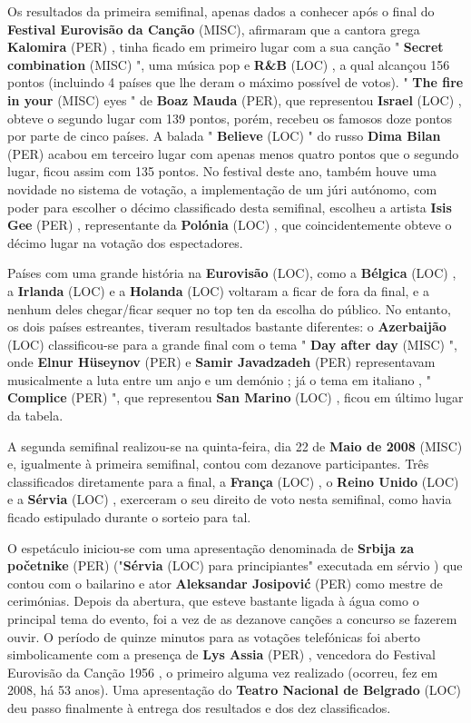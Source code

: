 \documentclass[12pt,a4paper]{article}
\begin{document}
Os resultados da primeira semifinal, apenas dados a conhecer após o final do \textbf{Festival Eurovisão da Canção} (MISC), afirmaram que a cantora grega \textbf{Kalomira} (PER) , tinha ficado em primeiro lugar com a sua canção " \textbf{Secret combination} (MISC) ", uma música pop e \textbf{R\&B} (LOC) , a qual alcançou 156 pontos (incluindo 4 países que lhe deram o máximo possível de votos). " \textbf{The fire in your} (MISC) eyes " de \textbf{Boaz Mauda} (PER), que representou \textbf{Israel} (LOC) , obteve o segundo lugar com 139 pontos, porém, recebeu os famosos doze pontos por parte de cinco países. A balada " \textbf{Believe} (LOC) " do russo \textbf{Dima Bilan} (PER) acabou em terceiro lugar com apenas menos quatro pontos que o segundo lugar, ficou assim com 135 pontos. No festival deste ano, também houve uma novidade no sistema de votação, a implementação de um júri autónomo, com poder para escolher o décimo classificado desta semifinal, escolheu a artista \textbf{Isis Gee} (PER) , representante da \textbf{Polónia} (LOC) , que coincidentemente obteve o décimo lugar na votação dos espectadores.

Países com uma grande história na \textbf{Eurovisão} (LOC), como a \textbf{Bélgica} (LOC) , a \textbf{Irlanda} (LOC) e a \textbf{Holanda} (LOC) voltaram a ficar de fora da final, e a nenhum deles chegar/ficar sequer no top ten da escolha do público. No entanto, os dois países estreantes, tiveram resultados bastante diferentes: o \textbf{Azerbaijão} (LOC) classificou-se para a grande final com o tema " \textbf{Day after day} (MISC) ", onde \textbf{Elnur Hüseynov} (PER) e \textbf{Samir Javadzadeh} (PER) representavam musicalmente a luta entre um anjo e um demónio ; já o tema em italiano , " \textbf{Complice} (PER) ", que representou \textbf{San Marino} (LOC) , ficou em último lugar da tabela.

A segunda semifinal realizou-se na quinta-feira, dia 22 de \textbf{Maio de 2008} (MISC) e, igualmente à primeira semifinal, contou com dezanove participantes. Três classificados diretamente para a final, a \textbf{França} (LOC) , o \textbf{Reino Unido} (LOC) e a \textbf{Sérvia} (LOC) , exerceram o seu direito de voto nesta semifinal, como havia ficado estipulado durante o sorteio para tal.

O espetáculo iniciou-se com uma apresentação denominada de \textbf{Srbija za početnike} (PER) ("\textbf{Sérvia} (LOC) para principiantes" executada em sérvio ) que contou com o bailarino e ator \textbf{Aleksandar Josipović} (PER) como mestre de cerimónias. Depois da abertura, que esteve bastante ligada à água como o principal tema do evento, foi a vez de as dezanove canções a concurso se fazerem ouvir. O período de quinze minutos para as votações telefónicas foi aberto simbolicamente com a presença de \textbf{Lys Assia} (PER) , vencedora do Festival Eurovisão da Canção 1956 , o primeiro alguma vez realizado (ocorreu, fez em 2008, há 53 anos). Uma apresentação do \textbf{Teatro Nacional de Belgrado} (LOC) deu passo finalmente à entrega dos resultados e dos dez classificados.
\end{document}
